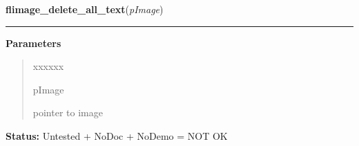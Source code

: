\hspace{.8\funcindent}\begin{boxedminipage}{\funcwidth}

    \raggedright \textbf{flimage\_delete\_all\_text}(\textit{pImage})

    \vspace{-1.5ex}

    \rule{\textwidth}{0.5\fboxrule}
\setlength{\parskip}{2ex}
\setlength{\parskip}{1ex}
      \textbf{Parameters}
      \vspace{-1ex}

      \begin{quote}
        \begin{Ventry}{xxxxxx}

          \item[pImage]

          pointer to image

        \end{Ventry}

      \end{quote}

\textbf{Status:} Untested + NoDoc + NoDemo = NOT OK



    \end{boxedminipage}

    \label{xformslib:flflimage:flimage_add_marker}

    \vspace{0.5ex}

